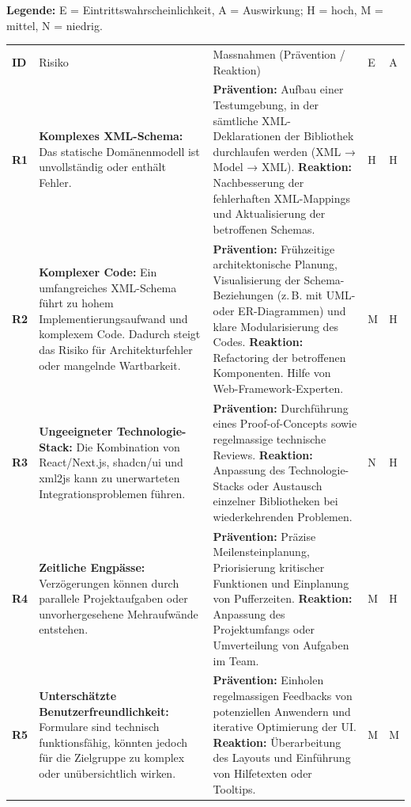 \documentclass[a4paper,12pt]{article}
\begin{document}
\begin{minipage}{\textwidth}
   {\footnotesize \textbf{Legende:} E = Eintrittswahrscheinlichkeit,\; A = Auswirkung;\; H = hoch,\; M = mittel,\; N = niedrig.}
  \vspace{0.3em}

\begin{small}
\begin{tabularx}{\textwidth}{>{\bfseries}p{0.5cm} p{5.3cm} X p{0.7cm} p{0.7cm}}
\rowcolor{gray!20}
ID & Risiko & Massnahmen (Prävention / Reaktion) & E & A \\

R1 & \textbf{Komplexes XML-Schema:}  
Das statische Domänenmodell ist unvollständig oder enthält Fehler. &  
\textbf{Prävention:} Aufbau einer Testumgebung, in der sämtliche XML-Deklarationen der Bibliothek durchlaufen werden (XML → Model → XML).  
\textbf{Reaktion:} Nachbesserung der fehlerhaften XML-Mappings und Aktualisierung der betroffenen Schemas. & H & H \\

R2 & \textbf{Komplexer Code:}  
Ein umfangreiches XML-Schema führt zu hohem Implementierungsaufwand und komplexem Code. Dadurch steigt das Risiko für Architekturfehler oder mangelnde Wartbarkeit. &  
\textbf{Prävention:} Frühzeitige architektonische Planung, Visualisierung der Schema-Beziehungen (z.\,B. mit UML- oder ER-Diagrammen) und klare Modularisierung des Codes.  
\textbf{Reaktion:} Refactoring der betroffenen Komponenten. Hilfe von Web-Framework-Experten. & M & H \\

R3 & \textbf{Ungeeigneter Technologie-Stack:}  
Die Kombination von React/Next.js, shadcn/ui und xml2js kann zu unerwarteten Integrationsproblemen führen. &  
\textbf{Prävention:} Durchführung eines Proof-of-Concepts sowie regelmassige technische Reviews.  
\textbf{Reaktion:} Anpassung des Technologie-Stacks oder Austausch einzelner Bibliotheken bei wiederkehrenden Problemen. & N & H \\

R4 & \textbf{Zeitliche Engpässe:}  
Verzögerungen können durch parallele Projektaufgaben oder unvorhergesehene Mehraufwände entstehen. &  
\textbf{Prävention:} Präzise Meilensteinplanung, Priorisierung kritischer Funktionen und Einplanung von Pufferzeiten.  
\textbf{Reaktion:} Anpassung des Projektumfangs oder Umverteilung von Aufgaben im Team. & M & H \\

R5 & \textbf{Unterschätzte Benutzerfreundlichkeit:}  
Formulare sind technisch funktionsfähig, könnten jedoch für die Zielgruppe zu komplex oder unübersichtlich wirken. &  
\textbf{Prävention:} Einholen regelmassigen Feedbacks von potenziellen Anwendern und iterative Optimierung der UI.  
\textbf{Reaktion:} Überarbeitung des Layouts und Einführung von Hilfetexten oder Tooltips. & M & M \\


\end{tabularx}
\end{small}
\end{minipage}
\end{document}
